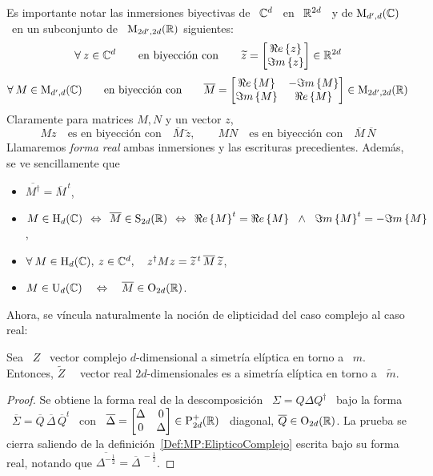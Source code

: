 Es importante notar  las inmersiones biyectivas de \ $\mathbb{C}^d$  \ en \ $\mathbb{R}^{2
  d}$  \  y de  $\mathrm{M}_{d',d}(\mathbb{C})$  \  en un  subconjunto  de  \ $\mathrm{M}_{2  d',
  2d}(\mathbb{R})$ siguientes:
%
\[
\forall \: z  \in \mathbb{C}^d \qquad \mbox{en biyecci\'on  con} \qquad \widetilde{z}
= \begin{bmatrix} \Re e \left\{ z \right\}\\ \Im m \left\{ z \right\} \end{bmatrix} \in \mathbb{R}^{2 d}
\]
%
\[
\forall  \:  M \in  \mathrm{M}_{d',d}(\mathbb{C})  \qquad  \mbox{en  biyecci\'on con}  \qquad
\overline{M}   =   \begin{bmatrix}   \Re e \left\{ M \right\}   &  -   \Im m \left\{ M \right\}\\   \Im m \left\{ M \right\}   &
  \Re e \left\{ M \right\} \end{bmatrix} \in \mathrm{M}_{2d',2d}(\mathbb{R})
\]
%
Claramente para matrices $M, N$ y un vector $z$,
%
\[
M z \quad \mbox{es en biyecci\'on con} \quad \overline{M} \, \widetilde{z}, \qquad
M N \quad \mbox{es en biyecci\'on con} \quad \overline{M} \, \overline{N}
\]
%
Llamaremos   {\em    forma   real}   ambas   inmersiones    y   las   escrituras
precedientes. Adem\'as, se ve sencillamente que
%
\begin{itemize}
\item  $\displaystyle   \overline{M^\dag}  =  \overline{M}^{\,   t}$,
%
\item $\displaystyle M \in  \mathrm{H}_d(\mathbb{C}) \:\: \Leftrightarrow \:\: \overline{M}
  \in \mathrm{S}_{2d}(\mathbb{R}) \:\: \Leftrightarrow \:\: \Re e \left\{ M \right\}^t = \Re e \left\{ M \right\} \, \:\: \wedge \:\: \,
  \Im m \left\{ M \right\}^t = - \Im m \left\{ M \right\}$,
%
\item $\forall  \: M \in  \mathrm{H}_d(\mathbb{C}), \:  z \in \mathbb{C}^d,  \quad z^\dag M  z =
  \widetilde{z}^{\, t} \, \overline{M} \, \widetilde{z}$,
%
\item  $M  \in  \mathrm{U}_d(\mathbb{C})  \quad  \Leftrightarrow  \quad  \overline{M}  \in
  \mathrm{O}_{2d}(\mathbb{R})$.
\end{itemize}
%

Ahora, se v\'incula naturalmente la noci\'on de elipticidad del caso complejo al
caso real:
%
\begin{lema}
  Sea \ $Z$ \ vector complejo $d$-dimensional a simetr\'ia el\'iptica en torno a
  \  $m$.  Entonces,  $\widetilde{Z}$ \  \ vector  real $2d$-dimensionales  es a
  simetr\'ia el\'iptica en torno a \ $\widetilde{m}$.
\end{lema}
%
\begin{proof}
  Se obtiene la forma real de la descomposici\'on \ $\Sigma = Q \Delta Q^\dag$ \
  bajo  la forma  \ $\overline{\Sigma}  = \overline{Q}  \,  \overline{\Delta} \,
  \overline{Q}^t$ \ con \ $\overline{\Delta}  = \begin{bmatrix} \Delta & 0\\ 0 &
    \Delta \end{bmatrix}  \in \mathrm{P}_{2d}^+(\mathbb{R})$ \  diagonal, $\overline{Q} \in
  \mathrm{O}_{2d}(\mathbb{R})$.      La    prueba    se     cierra    saliendo     de    la
  definici\'on~\ref{Def:MP:ElipticoComplejo} escrita bajo su forma real, notando
  que $\overline{\Delta^{-\frac12}} = \overline{\Delta}^{\: -\frac12}$.
\end{proof}

